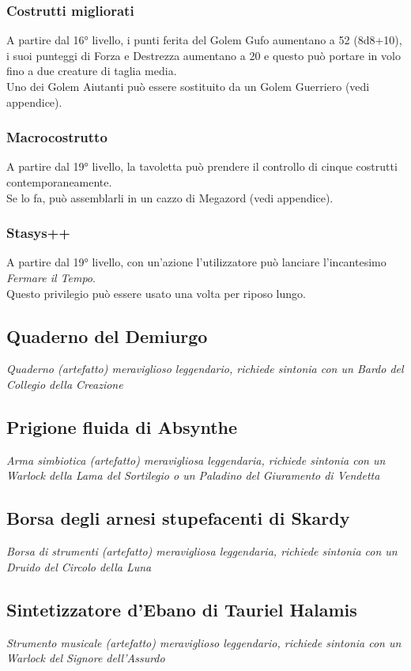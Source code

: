 \subsubsection{Costrutti migliorati}
A partire dal 16° livello, i punti ferita del Golem Gufo aumentano a 52 (8d8+10), i suoi punteggi di Forza e Destrezza aumentano a 20 e questo può portare in volo fino a due creature di taglia media.\\
Uno dei Golem Aiutanti può essere sostituito da un Golem Guerriero (vedi appendice).

\subsubsection{Macrocostrutto}
A partire dal 19° livello, la tavoletta può prendere il controllo di cinque costrutti contemporaneamente.\\ Se lo fa, può assemblarli in un cazzo di Megazord (vedi appendice).

\subsubsection{Stasys++}
A partire dal 19° livello, con un'azione l'utilizzatore può lanciare l'incantesimo \textit{Fermare il Tempo}.\\
Questo privilegio può essere usato una volta per riposo lungo.

\subsection{Quaderno del Demiurgo}
\textit{Quaderno (artefatto) meraviglioso leggendario, richiede sintonia con un Bardo del Collegio della Creazione}

\subsection{Prigione fluida di Absynthe}
\textit{Arma simbiotica (artefatto) meravigliosa leggendaria, richiede sintonia con un Warlock della Lama del Sortilegio o un Paladino del Giuramento di Vendetta}

\subsection{Borsa degli arnesi stupefacenti di Skardy}
\textit{Borsa di strumenti (artefatto) meravigliosa leggendaria, richiede sintonia con un Druido del Circolo della Luna}

\subsection{Sintetizzatore d'Ebano di Tauriel Halamis}
\textit{Strumento musicale (artefatto) meraviglioso leggendario, richiede sintonia con un Warlock del Signore dell'Assurdo}

